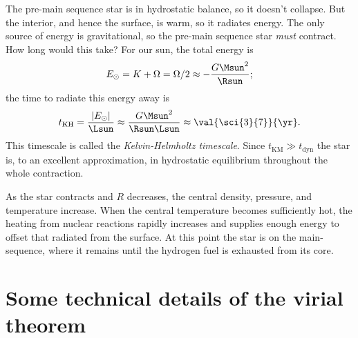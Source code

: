 The pre-main sequence star is in hydrostatic balance, so it doesn't collapse. But the interior, and hence the surface, is warm, so it radiates energy.  The only source of energy is gravitational, so the pre-main sequence star \emph{must} contract.  How long would this take?  For our sun, the total energy is
\[
	E_{\odot} = K + \Omega = \Omega/2 \approx -\frac{G\Msun^{2}}{\Rsun};
\]
the time to radiate this energy away is
\begin{equation}\label{e.kelvin-helmholtz}
t_{\mathrm{KH}} = \frac{|E_{\odot}|}{\Lsun} \approx \frac{G\Msun^{2}}{\Rsun\Lsun} \approx \val{\sci{3}{7}}{\yr}.
\end{equation}
This timescale is called the \emph{Kelvin-Helmholtz timescale}.  Since $t_{\mathrm{KM}} \gg t_{\mathrm{dyn}}$ the star is, to an excellent approximation, in hydrostatic equilibrium throughout the whole contraction.

As the star contracts and $R$ decreases, the central density, pressure, and temperature increase.  When the central temperature becomes sufficiently hot, the heating from nuclear reactions rapidly increases and supplies enough energy to offset that radiated from the surface.  At this point the star is on the main-sequence, where it remains until the hydrogen fuel is exhausted from its core.

\section{Some technical details of the virial theorem}
\label{s.technical-details-virial}


